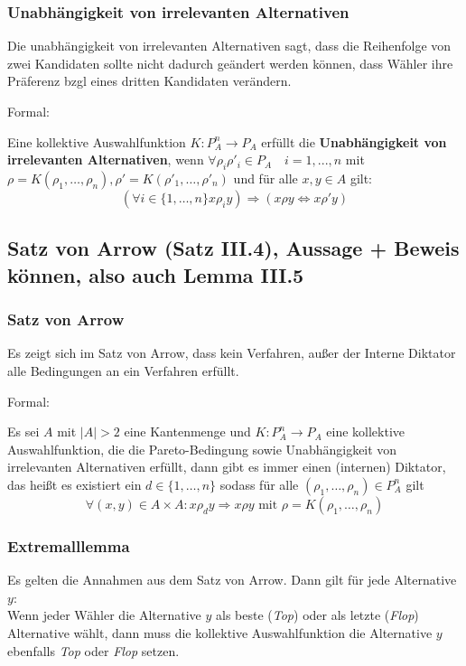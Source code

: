 \documentclass[]{article}
\begin{document}
\subsubsection*{Unabhängigkeit von irrelevanten Alternativen}
 Die unabhängigkeit von irrelevanten Alternativen sagt, dass die Reihenfolge von zwei Kandidaten sollte nicht dadurch geändert werden können, dass Wähler ihre Präferenz bzgl eines dritten Kandidaten verändern. 
 
 Formal:

Eine kollektive Auswahlfunktion $K : P_A^n \to P_A$ erfüllt die \textbf{Unabhängigkeit von irrelevanten Alternativen}, wenn
$\forall \rho_i \rho'_i \in P_A \quad i=1,...,n$ mit $\rho = K(\rho_1, \dots, \rho_n), \rho' = K(\rho'_1, \dots, \rho'_n)$ und für alle $x,y \in A$ gilt:
\begin{equation*}
\left( \forall i\in \{1, \dots, n\} x \rho_i y \right)
\Rightarrow \left( x \rho y \Leftrightarrow x \rho' y \right)
\end{equation*}

\subsection*{Satz von Arrow (Satz III.4), Aussage + Beweis können, also auch Lemma III.5}

\subsubsection*{Satz von Arrow}
Es zeigt sich im Satz von Arrow, dass kein Verfahren, außer der Interne Diktator alle Bedingungen an ein Verfahren erfüllt.

Formal: 

Es sei $A$ mit $|A| > 2$ eine Kantenmenge und $K: P_A^n \to P_A$ eine kollektive Auswahlfunktion, die die Pareto-Bedingung sowie Unabhängigkeit von irrelevanten Alternativen erfüllt, dann gibt es immer einen (internen) Diktator, das heißt es existiert ein $d \in \{1, \dots, n\}$ sodass für alle $(\rho_1, \dots, \rho_n) \in P_A^n$ gilt
\begin{equation*}
\forall (x,y) \in A \times A : x \rho_d y \Rightarrow x \rho y \text{ mit } \rho = K(\rho_1, \dots, \rho_n)
\end{equation*}

\subsubsection*{Extremalllemma}
Es gelten die Annahmen aus dem Satz von Arrow. Dann gilt für jede Alternative $y$:\\
Wenn jeder Wähler die Alternative $y$ als beste (\textit{\glqq Top\grqq}) oder als letzte (\textit{\glqq Flop\grqq}) Alternative wählt, dann muss die kollektive Auswahlfunktion die Alternative $y$ ebenfalls \textit{\glqq Top\grqq} oder \textit{\glqq Flop\grqq} setzen. \\
\end{document}
